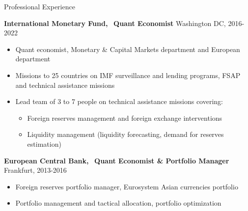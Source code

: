 \documentclass[usegeometry, 10pt, a4paper]{cv} %
\newcommand{\activite}[1]{\textbf{#1}\ }
\begin{document}
\begin{rubriquetableau}[0.95\textwidth]{Professional Experience}
\vspace{0.2cm}

\activite{International Monetary Fund,} \textbf{Quant Economist} \hfill Washington DC, 2016-2022 \\
\vspace{-0.2cm}

\begin{itemize}[label={}, rightmargin=\dimexpr\linewidth-13cm-\leftmargin\relax]
\item Quant economist, Monetary \& Capital Markets department and European department
\item Missions to 25 countries on IMF surveillance and lending programs, FSAP and technical assistance missions
\item Lead team of 3 to 7 people on technical assistance missions covering:
  \begin{itemize}
  \item Foreign reserves management and foreign exchange interventions
  \item Liquidity management (liquidity forecasting, demand for reserves estimation)
  \end{itemize}
 \end{itemize}
 
\vspace{0.2cm}

\activite{European Central Bank,} \textbf{Quant Economist \& Portfolio Manager} \hfill Frankfurt, 2013-2016 \\
\vspace{-0.2cm}

\begin{itemize}[label={}, rightmargin=\dimexpr\linewidth-13cm-\leftmargin\relax]
\item Foreign reserves portfolio manager, Eurosystem Asian currencies portfolio 
\item Portfolio management and tactical allocation, portfolio optimization
\end{itemize}
\end{rubriquetableau}


\newpage
\end{document}
